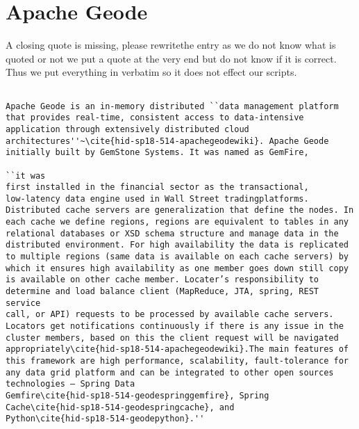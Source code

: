 \section{Apache Geode}

\begin{NOTE}

  A closing quote is missing, please rewritethe entry as we do not
  know what is quoted or not we put a quote at the very end but do not
  know if it is correct. Thus we put everything in verbatim so it does
  not effect our scripts.

\end{NOTE}


\begin{verbatim}

Apache Geode is an in-memory distributed ``data management platform
that provides real-time, consistent access to data-intensive
application through extensively distributed cloud
architectures''~\cite{hid-sp18-514-apachegeodewiki}. Apache Geode
initially built by GemStone Systems. It was named as GemFire, 

``it was
first installed in the financial sector as the transactional,
low-latency data engine used in Wall Street tradingplatforms.
Distributed cache servers are generalization that define the nodes. In
each cache we define regions, regions are equivalent to tables in any
relational databases or XSD schema structure and manage data in the
distributed environment. For high availability the data is replicated
to multiple regions (same data is available on each cache servers) by
which it ensures high availability as one member goes down still copy
is available on other cache member. Locater’s responsibility to
determine and load balance client (MapReduce, JTA, spring, REST service
call, or API) requests to be processed by available cache servers.
Locators get notifications continuously if there is any issue in the
cluster members, based on this the client request will be navigated
appropriately\cite{hid-sp18-514-apachegeodewiki}.The main features of
this framework are high performance, scalability, fault-tolerance for
any data grid platform and can be integrated to other open sources
technologies – Spring Data
Gemfire\cite{hid-sp18-514-geodespringgemfire}, Spring
Cache\cite{hid-sp18-514-geodespringcache}, and
Python\cite{hid-sp18-514-geodepython}.''

\end{verbatim}
